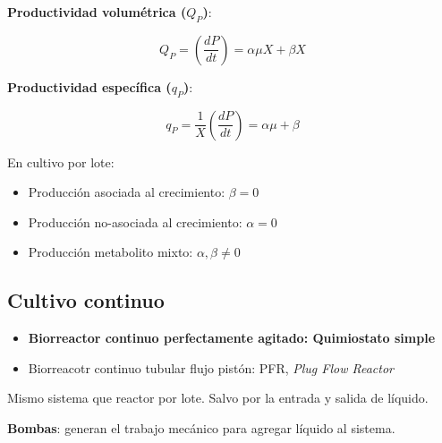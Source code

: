             
            \textbf{Productividad volumétrica (\(Q_{P}\))}:
            
            \begin{equation}
            \label{eq:productividad_volumetrica}
                Q_{P} = \left ( \frac{dP}{dt} \right ) = \alpha \mu X + \beta X
            \end{equation}
            
            \textbf{Productividad específica (\(q_{P}\))}:
            
            \begin{equation}
            \label{eq:productividad_especifica}
                q_{P} = \frac{1}{X} \left ( \frac{dP}{dt} \right ) = \alpha \mu + \beta
            \end{equation}
            
            En cultivo por lote:
            \begin{itemize}
                \item Producción asociada al crecimiento: \(\beta = 0\)
                \item Producción no-asociada al crecimiento: \(\alpha = 0\)
                \item Producción metabolito mixto: \(\alpha, \beta \neq 0\)
            \end{itemize}
    
    \subsection{Cultivo continuo}
    
    \begin{itemize}
        \item \textbf{Biorreactor continuo perfectamente agitado: Quimiostato simple}
        \item Biorreacotr continuo tubular flujo pistón: PFR, \textit{Plug Flow Reactor}
    \end{itemize}
    
    Mismo sistema que reactor por lote. Salvo por la entrada y salida de líquido.
    
    \textbf{Bombas}: generan el trabajo mecánico para agregar líquido al sistema.
    
